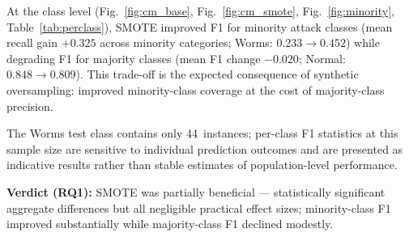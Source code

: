 \documentclass[conference,a4paper]{IEEEtran}
\newcommand{\SMOTE}{SMOTE\xspace}
\begin{document}
At the class level (Fig.~\ref{fig:cm_base}, Fig.~\ref{fig:cm_smote},
Fig.~\ref{fig:minority}, Table~\ref{tab:perclass}), \SMOTE improved F1 for
minority attack classes (mean recall gain $+0.325$ across minority categories;
Worms: $0.233\to0.452$) while degrading F1 for majority classes (mean F1
change $-0.020$; Normal: $0.848\to0.809$). This trade-off is the expected
consequence of synthetic oversampling: improved minority-class coverage at the
cost of majority-class precision.

The Worms test class contains only 44~instances; per-class F1 statistics at this
sample size are sensitive to individual prediction outcomes and are presented as
indicative results rather than stable estimates of population-level performance.

\smallskip
\noindent\textbf{Verdict (RQ1):} \SMOTE was partially beneficial --- statistically
significant aggregate differences but all negligible practical effect sizes;
minority-class F1 improved substantially while majority-class F1 declined modestly.
\end{document}
